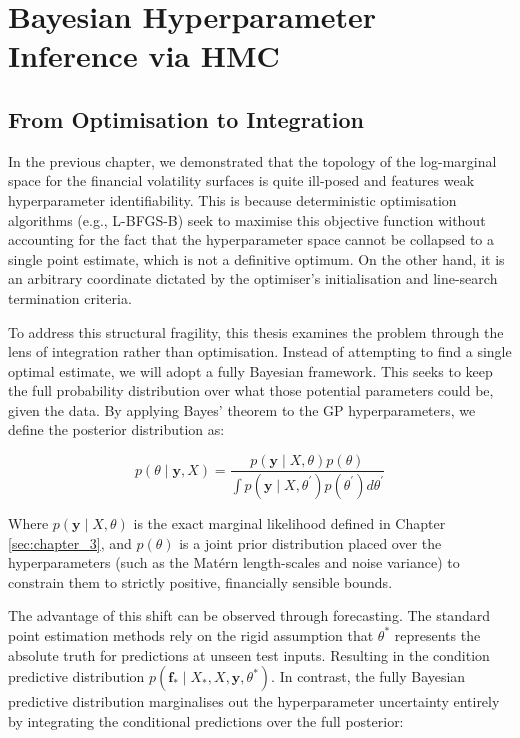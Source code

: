 \documentclass[12pt,oneside]{report}
\theoremstyle{definition}
\theoremstyle{remark}
\begin{document}
\chapter{Bayesian Hyperparameter Inference via HMC}
\label{sec:chapter_5}
\section{From Optimisation to Integration}
In the previous chapter, we demonstrated that the topology of the log-marginal space for the financial volatility surfaces is quite ill-posed and features weak hyperparameter identifiability. This is because deterministic optimisation algorithms (e.g., L-BFGS-B) seek to maximise this objective function without accounting for the fact that the hyperparameter space cannot be collapsed to a single point estimate, which is not a definitive optimum. On the other hand, it is an arbitrary coordinate dictated by the optimiser's initialisation and line-search termination criteria. 

To address this structural fragility, this thesis examines the problem through the lens of integration rather than optimisation. Instead of attempting to find a single optimal estimate, we will adopt a fully Bayesian framework. This seeks to keep the full probability distribution over what those potential parameters could be, given the data. By applying Bayes' theorem to the GP hyperparameters, we define the posterior distribution as:

\begin{equation}
p(\theta \mid \mathbf{y}, X) = \frac{p(\mathbf{y} \mid X, \theta) p(\theta)}{\int p(\mathbf{y} \mid X, \theta^\prime) p(\theta^\prime) d\theta^\prime}
\label{eq:bayesian_theorem}
\end{equation}

Where $p(\mathbf{y} \mid X, \theta)$ is the exact marginal likelihood defined in Chapter \ref{sec:chapter_3}, and $p(\theta)$ is a joint prior distribution placed over the hyperparameters (such as the Matérn length-scales and noise variance) to constrain them to strictly positive, financially sensible bounds.

The advantage of this shift can be observed through forecasting. The standard point estimation methods rely on the rigid assumption that $\theta^*$ represents the absolute truth for predictions at unseen test inputs. Resulting in the condition predictive distribution $p(\mathbf{f}_* \mid X_*, X, \mathbf{y}, \theta^*)$. In contrast, the fully Bayesian predictive distribution marginalises out the hyperparameter uncertainty entirely by integrating the conditional predictions over the full posterior:
\end{document}
